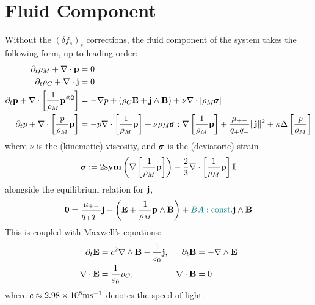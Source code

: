 \chapter{Fluid Component}

     Without the $(\delta f_{s})_{s}$ corrections, the fluid component of the system takes the following form, up to leading order: 
    \begin{align}
        \partial_{t}\rho_{M} + \nabla\cdot\mathbf{p}  &=  0  \\
        \partial_{t}\rho_{C} + \nabla\cdot\mathbf{j}  &=  0  \\
        \partial_{t}\mathbf{p} + \nabla\cdot\left[\frac{1}{\rho_{M}}\mathbf{p}^{\otimes 2}\right]  &=  - \nabla p + (\rho_{C}\mathbf{E} + \mathbf{j}\wedge\mathbf{B}) + \nu\nabla\cdot[\rho_{M}\pmb{\mathsf{\sigma}}]  \\
        \partial_{t}p + \nabla\cdot\left[\frac{p}{\rho_{M}}\mathbf{p}\right]  &=  - p\nabla\cdot\left[\frac{1}{\rho_{M}}\mathbf{p}\right] + \nu\rho_{M}\pmb{\mathsf{\sigma}}:\nabla\left[\frac{1}{\rho_{M}}\mathbf{p}\right] + \frac{\mu_{+-}}{q_{+}q_{-}}\|\mathbf{j}\|^{2} + \kappa\Delta\left[\frac{p}{\rho_{M}}\right]
    \end{align}
    where $\nu$ is the (kinematic) viscosity, and $\pmb{\mathsf{\sigma}}$ is the (deviatoric) strain
    \begin{equation}\label{eqn:strain equation}
        \pmb{\mathsf{\sigma}}  :=  2\mathbf{sym}\left(\nabla\left[\frac{1}{\rho_{M}}\mathbf{p}\right]\right) - \frac{2}{3}\nabla\cdot\left[\frac{1}{\rho_{M}}\mathbf{p}\right]\mathbf{I}
    \end{equation}
    alongside the equilibrium relation for $\mathbf{j}$,
    \begin{equation}
        \mathbf{0}  =  \frac{\mu_{+-}}{q_{+}q_{-}}\mathbf{j} - \left(\mathbf{E} + \frac{1}{\rho_{M}}\mathbf{p}\wedge\mathbf{B}\right) + \textcolor{teal}{BA: \rm const.}\mathbf{j}\wedge\mathbf{B}
    \end{equation}
    This is coupled with Maxwell's equations:
    \begin{align*}
        \partial_{t}\mathbf{E}  &=  c^{2}\nabla\wedge\mathbf{B} - \frac{1}{\varepsilon_{0}}\mathbf{j},  &
        \partial_{t}\mathbf{B}  &=  - \nabla\wedge\mathbf{E}  \\
        \nabla\cdot\mathbf{E}  &=  \frac{1}{\varepsilon_{0}}\rho_{C},  &
        \nabla\cdot\mathbf{B}  &=  0
    \end{align*}
    where $c \approx 2.98\times 10^{8}\mathrm{m}\mathrm{s}^{- 1}$ denotes the speed of light.

